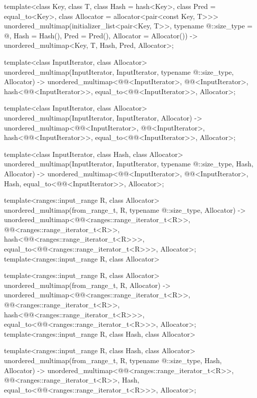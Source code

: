 \documentclass{wg21}
\begin{document}
\begin{codeblock}

template<class Key, class T, class Hash = hash<Key>,
class Pred = equal_to<Key>, class Allocator = allocator<pair<const Key, T>>>
unordered_multimap(initializer_list<pair<Key, T>>,
typename @\seebelow@::size_type = @\seebelow@,
Hash = Hash(), Pred = Pred(), Allocator = Allocator())
-> unordered_multimap<Key, T, Hash, Pred, Allocator>;

template<class InputIterator, class Allocator>
unordered_multimap(InputIterator, InputIterator, typename @\seebelow@::size_type, Allocator)
-> unordered_multimap<@@<InputIterator>, @@<InputIterator>,
hash<@@<InputIterator>>,
equal_to<@@<InputIterator>>, Allocator>;

template<class InputIterator, class Allocator>
unordered_multimap(InputIterator, InputIterator, Allocator)
-> unordered_multimap<@@<InputIterator>, @@<InputIterator>,
hash<@@<InputIterator>>,
equal_to<@@<InputIterator>>, Allocator>;

template<class InputIterator, class Hash, class Allocator>
unordered_multimap(InputIterator, InputIterator, typename @\seebelow@::size_type, Hash,
Allocator)
-> unordered_multimap<@@<InputIterator>, @@<InputIterator>, Hash,
equal_to<@@<InputIterator>>, Allocator>;

\end{codeblock}
\begin{addedblock}
\begin{codeblock}
template<ranges::input_range R, class Allocator>
unordered_multimap(from_range_t, R, typename @\seebelow@::size_type, Allocator)
-> unordered_multimap<@@<ranges::range_iterator_t<R>>, 
    @@<ranges::range_iterator_t<R>>, 
    hash<@@<ranges::range_iterator_t<R>>>,
    equal_to<@@<ranges::range_iterator_t<R>>>, Allocator>;
    template<ranges::input_range R, class Allocator>

template<ranges::input_range R, class Allocator>
unordered_multimap(from_range_t, R, Allocator)
-> unordered_multimap<@@<ranges::range_iterator_t<R>>, 
    @@<ranges::range_iterator_t<R>>, 
    hash<@@<ranges::range_iterator_t<R>>>,
    equal_to<@@<ranges::range_iterator_t<R>>>, Allocator>;
    template<ranges::input_range R, class Hash, class Allocator>

template<ranges::input_range R, class Hash, class Allocator>
unordered_multimap(from_range_t, R, typename @\seebelow@::size_type, Hash, Allocator)
-> unordered_multimap<@@<ranges::range_iterator_t<R>>, 
    @@<ranges::range_iterator_t<R>>, 
    Hash,
    equal_to<@@<ranges::range_iterator_t<R>>>, Allocator>;
\end{codeblock}
\end{addedblock}
\end{document}
